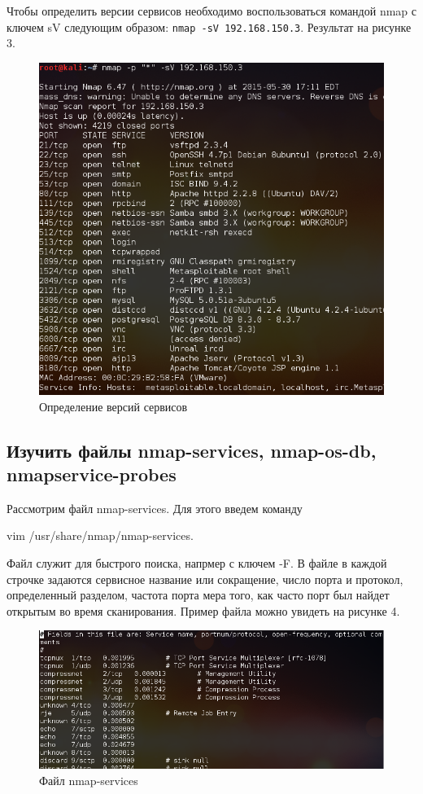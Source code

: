 \documentclass[11pt, a4paper]{article}		%
\begin{document}
Чтобы определить версии сервисов необходимо воспользоваться командой nmap с ключем sV следующим образом: \verb'nmap -sV 192.168.150.3'. 
Результат на рисунке 3.

\begin{figure}[h!]
\centering
\includegraphics[scale=0.8]{res/services_versions}
\caption{Определение версий сервисов}
\end{figure}


\subsection{Изучить файлы nmap-services, nmap-os-db, nmapservice-probes}

Рассмотрим файл nmap-services. Для этого введем команду 

vim /usr/share/nmap/nmap-services. 

Файл служит для быстрого поиска, напрмер с ключем -F. В файле в каждой строчке задаются сервисное название или сокращение, число порта и протокол, определенный разделом, частота порта мера того, как часто порт был найдет открытым во время сканирования. Пример файла можно увидеть на рисунке 4.


\begin{figure}[h!]
\centering
\includegraphics[scale=0.75]{res/nmap_services}
\caption{Файл nmap-services}
\end{figure}
\end{document}

